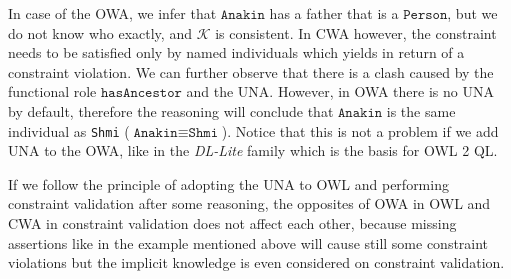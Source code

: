 \documentclass{llncs}
\newcommand{\ms}[1]{\texttt{#1}}
\newcommand{\er}[1]{\todo[size=\small, color=red!40]{\textbf{Erman:} #1}}
\begin{document}
In case of the OWA, we infer that $\ms{Anakin}$ has a father that is a $\ms{Person}$, but we do not know who exactly, and $\mathcal{K}$ is consistent. In CWA however, the constraint needs to be satisfied only by named individuals which yields in return of a constraint violation. We can further observe that there is a clash caused by the functional role $\ms{hasAncestor}$ and the UNA. However, in OWA there is no UNA by default, therefore the reasoning will conclude that $\ms{Anakin}$ is the same individual as \ms{Shmi} ($\ms{Anakin} \equiv \ms{Shmi}$). Notice that this is not a problem if we add UNA to the OWA, like in the \textit{DL-Lite} family \cite{Calvanese2007,Artale2009} which is the basis for OWL 2 QL. %

 If we follow the principle of adopting the UNA to OWL and performing constraint validation after some reasoning, the opposites of OWA in OWL and CWA in constraint validation does not affect each other, because missing assertions like in the example mentioned above will cause still some constraint violations but the implicit knowledge is even considered on constraint validation. 

%
%

\end{document}
